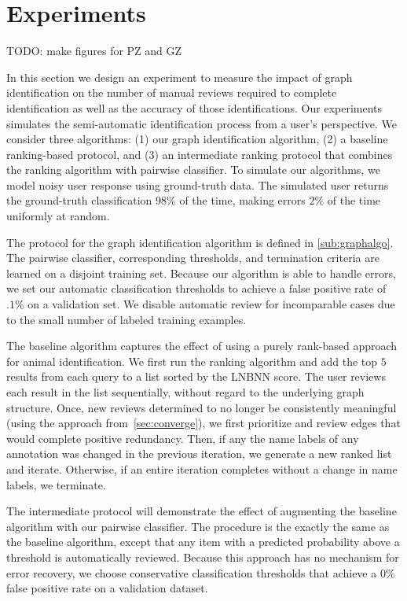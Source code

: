   
\section{Experiments}\label{sec:graphexpt}

    TODO: make figures for PZ and GZ

    In this section we design an experiment to measure the impact of graph identification on the number of manual
      reviews required to complete identification as well as the accuracy of those identifications.
    Our experiments simulates the semi-automatic identification process from a user's perspective.
    We consider three algorithms:
    (1) our graph identification algorithm,
    (2) a baseline ranking-based protocol, and
    (3) an intermediate ranking protocol that combines the ranking algorithm with pairwise classifier.
    To simulate our algorithms, we model noisy user response using ground-truth data.
    The simulated user returns the ground-truth classification $98\percent$ of the time, making errors
      $2\percent$ of the time uniformly at random.

    The protocol for the graph identification algorithm is defined in \cref{sub:graphalgo}.
    The pairwise classifier, corresponding thresholds, and termination criteria are learned on a disjoint
      training set.
    Because our algorithm is able to handle errors, we set our automatic classification thresholds to achieve a
      false positive rate of $.1\percent$ on a validation set.
    We disable automatic review for incomparable cases due to the small number of labeled training examples.

    The baseline algorithm captures the effect of using a purely rank-based approach for animal identification.
    We first run the ranking algorithm and add the top $5$ results from each query to a list sorted by the LNBNN
      score.
    The user reviews each result in the list sequentially, without regard to the underlying graph structure.
    Once, new reviews determined to no longer be consistently meaningful (using the approach
      from~\cref{sec:converge}), we first prioritize and review edges that would complete positive redundancy.
    Then, if any the name labels of any annotation was changed in the previous iteration, we generate a new
      ranked list and iterate.
    Otherwise, if an entire iteration completes without a change in name labels, we terminate.

    The intermediate protocol will demonstrate the effect of augmenting the baseline algorithm with our pairwise
      classifier.
    The procedure is the exactly the same as the baseline algorithm, except that any item with a predicted
      probability above a threshold is automatically reviewed.
    Because this approach has no mechanism for error recovery, we choose conservative classification thresholds
      that achieve a $0\percent$ false positive rate on a validation dataset.

